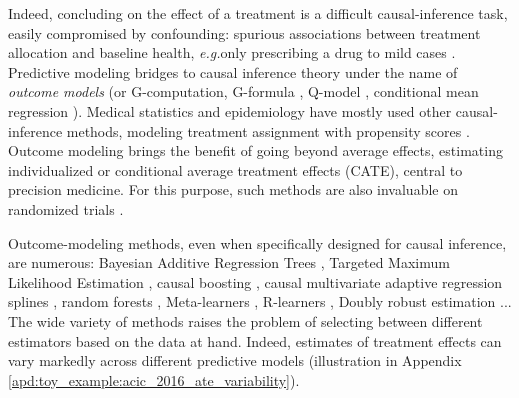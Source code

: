 \documentclass[11pt]{article}
\let\cite=\supercite
\newcommand{\eg}{\emph{e.g.}}
\begin{document}
Indeed, concluding on the effect of a treatment is a difficult
causal-inference task, easily compromised by confounding:
spurious associations between treatment
allocation and baseline health, \eg only prescribing a drug to mild cases
\citep{hernan_causal_2020,vanderweele2019principles}.
Predictive modeling bridges to causal inference theory under the name of
\emph{outcome models} (or G-computation, 
G-formula \cite{robins_role_1986}, Q-model
\cite{snowden_implementation_2011}, conditional mean regression
\cite{wendling_comparing_2018}). 
Medical statistics and epidemiology have mostly used other
causal-inference methods, modeling treatment assignment
with propensity scores \cite{rosenbaum_central_1983,austin_moving_2015,casucci2018estimating,grose_use_2020}. Outcome modeling brings
the benefit of going
beyond average effects, estimating individualized or conditional average
treatment effects (CATE), central to precision medicine.
%
For this purpose, such methods are also invaluable on randomized trials
\cite{su2018random,lamont2018identification,hoogland2021tutorial}.


Outcome-modeling methods, even when specifically designed for causal
inference, are numerous: Bayesian Additive Regression Trees
\cite{hill_bayesian_2011}, Targeted Maximum Likelihood Estimation
\cite{laan_targeted_2011,schuler_targeted_2017}, causal boosting
\cite{powers_methods_2018}, causal multivariate adaptive regression
splines \cite{powers_methods_2018}, random forests
\cite{wager_estimation_2018, athey_generalized_2019},
Meta-learners \cite{kunzel_metalearners_2019}, R-learners
\cite{nie_quasioracle_2017}, Doubly robust estimation
\cite{chernozhukov_double_2018}...
The wide variety of methods raises the problem
of selecting between different estimators based on the data at hand. %
%
Indeed, estimates of treatment effects can vary markedly across different
predictive models \cite{fang2019applying,dorie_automated_2019} (illustration in
Appendix \ref{apd:toy_example:acic_2016_ate_variability}).
\end{document}
